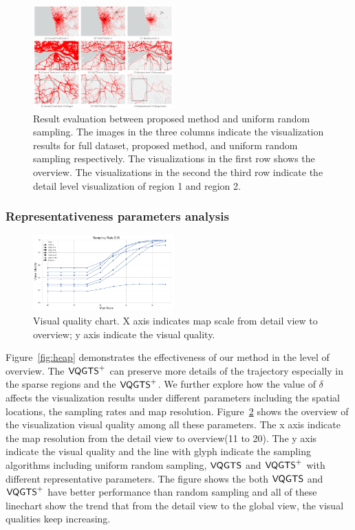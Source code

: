 \begin{figure}[t]
	\centering
	\includegraphics[width=0.48\textwidth]{pictures/experiment_study/Method_resolution_study.pdf}
	\vspace{-5mm}
	\caption{Result evaluation between proposed method and uniform random sampling. The images in the three columns indicate the visualization results for full dataset, proposed method, and uniform random sampling respectively. The visualizations in the first row shows the overview. The visualizations in the second the third row indicate the detail level visualization of region 1 and region 2. }
	\vspace{-5mm}
	\label{fig:random_proposed}
\end{figure}

\subsubsection{Representativeness parameters analysis}
\begin{figure}[t]
	\centering
	\vspace{2mm}
	\includegraphics[width=0.48\textwidth]{pictures/experiment_study/quanlity.png}
	\caption{Visual quality chart. X axis indicates map scale from detail view to overview; y axis indicate the visual quality. }
	\vspace{0mm}
	\label{fig:quality_chart}
\end{figure}
Figure~\ref{fig:heap} demonstrates the effectiveness of our method in the level of overview. The $\mathsf{VQGTS}^{+}$ can preserve more details of the trajectory especially in the sparse regions and the $\mathsf{VQGTS}^{+}$. We further explore how the value of $\delta$ affects the visualization results under different parameters including the spatial locations, the sampling rates and map resolution. Figure~\ref{fig:quality_chart} shows the overview of the visualization visual quality among all these parameters. The x axis indicate the map resolution from the detail view to overview(11 to 20). The y axis indicate the visual quality and the line with glyph indicate the sampling algorithms including uniform random sampling, $\mathsf{VQGTS}$ and $\mathsf{VQGTS}^{+}$ with different representative parameters. The figure shows the both $\mathsf{VQGTS}$ and $\mathsf{VQGTS}^{+}$ have better performance than random sampling and all of these linechart show the trend that from the detail view to the global view, the visual qualities keep increasing. 


